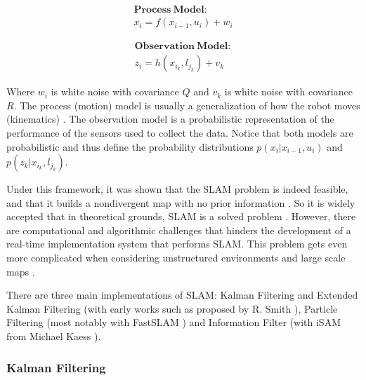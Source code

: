\documentclass[12pt]{article}
\begin{document}
\begin{minipage}{.48\linewidth}
\centering
\begin{equation*}
\begin{split}
\mathbf{Process\ Model:} \\ 
x_i = f(x_{i-1}, u_i) + w_i
\end{split}
\end{equation*}
\end{minipage}
\begin{minipage}{.48\linewidth}
\centering
\begin{equation*}
\begin{split}
\mathbf{Observation\ Model:} \\ 
z_i = h(x_{i_k}, l_{j_k}) + v_k
\end{split}
\end{equation*}
\end{minipage}
	
Where $w_i$ is white noise with covariance $Q$ and $v_k$ is white noise with covariance $R$. The process (motion) model is usually a generalization of how the robot moves (kinematics) \cite{Montemerlo02fastslam:a}\cite{772544}. The observation model is a probabilistic representation of the performance of the sensors used to collect the data. Notice that both models are probabilistic and thus define the probability distributions $p(x_i|x_{i-1},u_i)$ and $p(z_k|x_{i_k},l_{j_k})$.

Under this framework, it was shown that the SLAM problem is indeed feasible, and that it builds a nondivergent map with no prior information \cite{CsorbaThesis}. So it is widely accepted that in theoretical grounds, SLAM is a solved problem \cite{SLAMPartI}\cite{Cadena}\cite{CsorbaThesis}\cite{938381}. However, there are computational and algorithmic challenges that hinders the development of a real-time implementation system that performs SLAM. This problem gets even more complicated when considering unstructured environments and large scale maps \cite{SLAMPartII}.
	
There are three main implementations of SLAM: Kalman Filtering and Extended Kalman Filtering (with early works such as proposed by R. Smith \cite{Smith:1990:EUS:93002.93291}), Particle Filtering (most notably with FastSLAM \cite{Montemerlo02fastslam:a}) and Information Filter (with iSAM from Michael Kaess \cite{Kaess08tro}).

	\subsubsection{Kalman Filtering}
\end{document}
